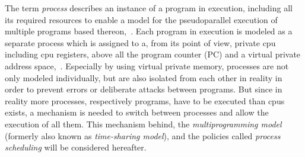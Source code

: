%
%
%


The term \textit{process} describes an instance of a program in execution, including all its required resources to enable a model for the pseudoparallel execution of multiple programs based thereon\cite{silberschatz2009operating},~\cite{tanenbaum-modern-operating-systems}.
Each program in execution is modeled as a separate process which is assigned to a, from its point of view, private \ac{cpu} including \ac{cpu} registers, above all the program counter (PC) and a virtual private address space\cite{tanenbaum-modern-operating-systems},~\cite{glatz2015betriebssysteme}.
Especially by using virtual private memory, processes are not only modeled individually, but are also isolated from each other in reality in order to prevent errors or deliberate attacks between programs\cite{brause2017betriebssysteme}.
But since in reality more processes, respectively programs, have to be executed than \acp{cpu} exists, a mechanism is needed to switch between processes and allow the execution of all them.
This mechanism behind, the \textit{multiprogramming model} (formerly also known as \textit{time-sharing model}), and the policies called \textit{process scheduling} will be considered hereafter.

